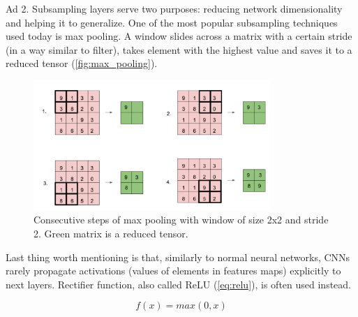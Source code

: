 \documentclass[11pt]{article}
\begin{document}
Ad 2. Subsampling layers serve two purposes: reducing network dimensionality and helping it to generalize. One of the most popular subsampling techniques used today is max pooling. A window slides across a matrix with a certain stride (in a way similar to filter), takes element with the highest value and saves it to a reduced tensor (\autoref{fig:max_pooling}).\\

\begin{figure}[h]
\includegraphics[width=0.8\textwidth]{max_pooling}
\centering
\caption{Consecutive steps of max pooling with window of size 2x2 and stride 2. Green matrix is a reduced tensor.}
\label{fig:max_pooling}
\end{figure}

Last thing worth mentioning is that, similarly to normal neural networks, CNNs rarely propagate activations (values of elements in features maps) explicitly to next layers. Rectifier function, also called ReLU (\autoref{eq:relu}), is often used instead.

\begin{equation} \label{eq:relu}
f(x) = max(0, x)
\end{equation}
\clearpage
\end{document}
